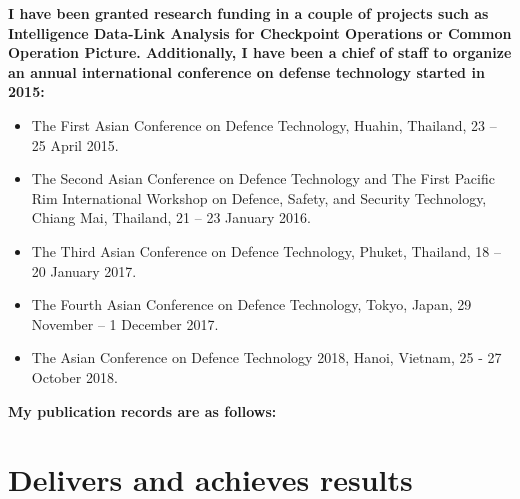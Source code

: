 \documentclass[12pt]{article}
\begin{document}
{\bfseries I have been granted research funding in a couple of projects such as Intelligence Data-Link Analysis for Checkpoint Operations or Common Operation Picture. Additionally, I have been a chief of staff to organize an annual international conference on defense technology started in 2015:}
\begin{itemize}
    \item The First Asian Conference on Defence Technology, Huahin, Thailand, 23 – 25 April 2015.
    \item The Second Asian Conference on Defence Technology and The First Pacific Rim International Workshop on Defence, Safety, and Security Technology, Chiang Mai, Thailand, 21 – 23 January 2016.
    \item The Third Asian Conference on Defence Technology, Phuket, Thailand, 18 – 20 January 2017.
    \item The Fourth Asian Conference on Defence Technology, Tokyo, Japan, 29 November – 1 December 2017.
    \item  The Asian Conference on Defence Technology 2018, Hanoi, Vietnam, 25 - 27 October 2018.
\end{itemize}

{\bfseries My publication records are as follows:}

\begin{refsection}
    \nocite{Kerdsri2017}
    \nocite{doi:10.1155/2015/819178}
    \nocite{Kerdsri2013}
    \nocite{journal2013}
    \nocite{waset2011}
    \AtNextBibliography{\small}
    \printbibliography[title={Journals}]
  \end{refsection}

  \begin{refsection}
    \nocite{Kerdsri2018}
    \nocite{7886152}
    \nocite{7332543}
    \nocite{Kerdsri2012}
    \nocite{6427357}
    \nocite{6174610}
    \nocite{waset2010}
    \AtNextBibliography{\small}
    \printbibliography[title={Conference Proceedings}]
  \end{refsection}
  
  \begin{refsection}
    \nocite{book2013}
    \nocite{book2013a}
    \nocite{book2012}
    \nocite{book2012a}
    \nocite{book2012b}
    \nocite{book2007}
    \nocite{kerdsri2003snmp}
    \AtNextBibliography{\small}
    \printbibliography[title={Books}]
  \end{refsection}



\section*{Delivers and achieves results}
\end{document}
